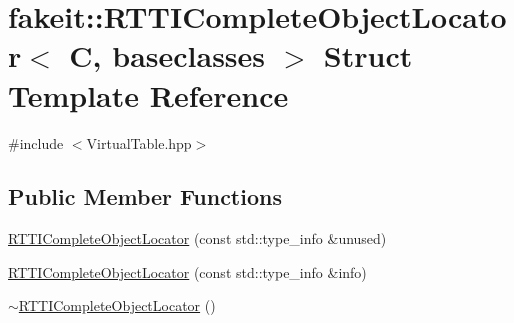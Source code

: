 \hypertarget{structfakeit_1_1RTTICompleteObjectLocator}{}\section{fakeit\+::R\+T\+T\+I\+Complete\+Object\+Locator$<$ C, baseclasses $>$ Struct Template Reference}
\label{structfakeit_1_1RTTICompleteObjectLocator}


{\ttfamily \#include $<$Virtual\+Table.\+hpp$>$}

\subsection*{Public Member Functions}
\begin{DoxyCompactItemize}
\item 
\mbox{\hyperlink{structfakeit_1_1RTTICompleteObjectLocator_a46c4b9221e04dae0592bd82eb29a3723}{R\+T\+T\+I\+Complete\+Object\+Locator}} (const std\+::type\+\_\+info \&unused)
\item 
\mbox{\hyperlink{structfakeit_1_1RTTICompleteObjectLocator_a77a95dc601a1cf4bbd59c5dc396f919e}{R\+T\+T\+I\+Complete\+Object\+Locator}} (const std\+::type\+\_\+info \&info)
\item 
\mbox{\hyperlink{structfakeit_1_1RTTICompleteObjectLocator_af2f862281f000e8d6ce4572037cad864}{$\sim$\+R\+T\+T\+I\+Complete\+Object\+Locator}} ()
\end{DoxyCompactItemize}
